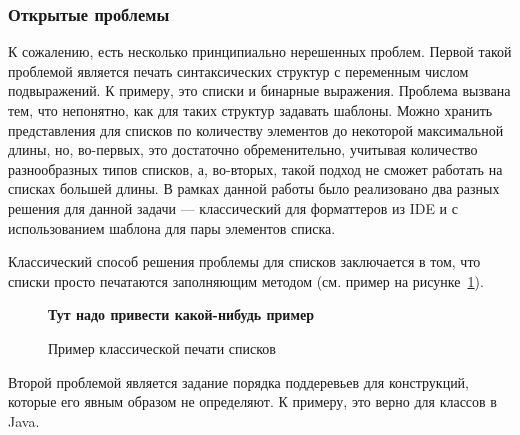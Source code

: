 \begin{table}
	\centering



	\caption{Время форматирования файлов (в секундах)}
	\label{tbl:pluginPerformanceTbl}
\end{table}

\subsubsection{Открытые проблемы}

К сожалению, есть несколько принципиально нерешенных проблем. Первой такой
проблемой является печать синтаксических структур с переменным числом
подвыражений. К примеру, это списки и бинарные выражения. Проблема вызвана
тем, что непонятно, как для таких структур задавать шаблоны. Можно хранить
представления для списков по количеству элементов
до некоторой максимальной длины, но,
во-первых, это достаточно обременительно, учитывая количество разнообразных
типов списков, а, во-вторых, такой подход не сможет работать на списках большей
длины. В рамках данной работы было реализовано два разных решения для данной
задачи --- классический для форматтеров из IDE и с использованием шаблона для
пары элементов списка.

Классический способ решения проблемы для списков заключается в том, что
списки просто печатаются заполняющим методом (см. пример на
рисунке~\ref{fig:listClassicEx}).

\begin{figure}[h!]
  \textbf{Тут надо привести какой-нибудь пример}

  \caption{Пример классической печати списков}
  \label{fig:listClassicEx}
\end{figure}


Второй проблемой является задание порядка поддеревьев для конструкций, которые
его явным образом не определяют. К примеру, это верно для классов в Java.

